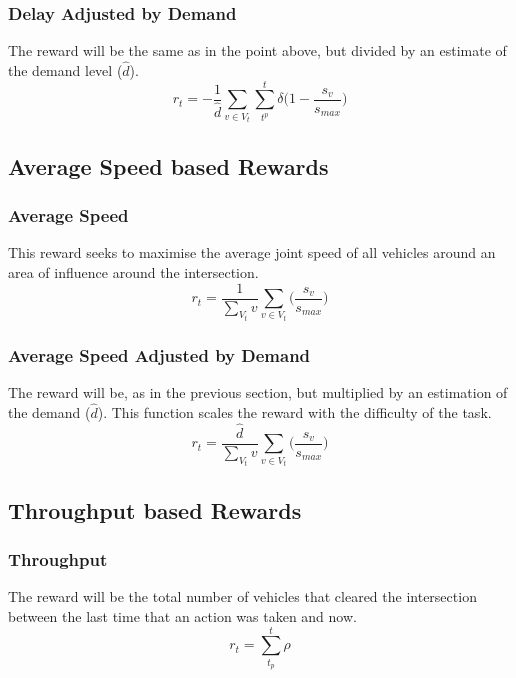 \documentclass[conference]{IEEEtran}
\begin{document}
\subsubsection{Delay Adjusted by Demand}
The reward will be the same as in the point above, but divided by an estimate of the demand level ($\hat{d}$).
\begin{equation}
    r_t = -\frac{1}{\hat{d}} \sum_{v\in V_t}  \sum_{t^p}^t \delta  \big( 1-\frac{s_v}{s_{max}} \big)
\label{eq:delay_dn}
\end{equation}

\subsection{Average Speed based Rewards}
\subsubsection{Average Speed}
This reward seeks to maximise the average joint speed of all vehicles around an area of influence around the intersection.
\begin{equation}
    r_t = \frac{1}{\sum_{V_t} v} \sum_{v \in V_t} \big( \frac{s_v}{s_{max}} \big)
\label{eq:avgspeed}
\end{equation}

\subsubsection{Average Speed Adjusted by Demand}
The reward will be, as in the previous section, but multiplied by an estimation of the demand ($\hat{d}$). This function scales the reward with the difficulty of the task.
\begin{equation}
    r_t = \frac{\hat{d}}{\sum_{V_t} v} \sum_{v \in V_t} \big( \frac{s_v}{s_{max}} \big)
\label{eq:avgspeed_dn}
\end{equation}

\subsection{Throughput based Rewards}
\subsubsection{Throughput}
The reward will be the total number of vehicles that cleared the intersection between the last time that an action was taken and now.
\begin{equation}
    r_t = \sum_{t_p}^t \rho
\label{eq:throughput}
\end{equation}
\end{document}
